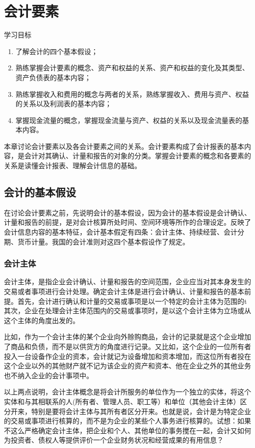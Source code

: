 \chapter{会计要素}
	{\heiti 学习目标}

	\begin{enumerate}
		\item 了解会计的四个基本假设；
		\item 熟练掌握会计要素的概念、资产和权益的关系、资产和权益的变化及其类型、资产负债表的基本内容；
		\item 熟练掌握收入和费用的概念与两者的关系，熟练掌握收入、费用与资产、权益的关系以及利润表的基本内容；
		\item 掌握现金流量的概念，掌握现金流量与资产、权益的关系以及现金流量表的基本内容。
	\end{enumerate}

	本章讨论会计要素以及各会计要素之间的关系。会计要素构成了会计报表的基本内容，是会计对其确认、计量和报告的对象的分类。掌握会计要素的概念和各要素的关系是读懂会计报表、理解会计信息的基础。

	\section{会计的基本假设}
	
	在讨论会计要素之前，先说明会计的基本假设，因为会计的基本假设是会计确认、计量和报告的前提，是对会计核算所处时间、空间环境等所作的合理设定。反映了会计信息内容的基本特征，会计基本假定有四条：会计主体、持续经营、会计分期、货币计量。我国的会计准则对这四个基本假设作了规定。
	
		\subsection{会计主体}

		会计主体，是指企业会计确认、计量和报告的空间范围，企业应当对其本身发生的交易或者事项进行会计处理。确定会计主体是进行会计确认、计量和报告的基本前提。首先，会计进行确认和计量的交易或事项是以一个特定的会计主体为范围的t其次，企业在处理会计主体范围内的交易或事项时，是以这个会计主体为立场或从这个主体的角度出发的。
		
		比如，作为一个会计主体的某个企业向外赊购商品，会计的记录就是这个企业增加了商品和负债，而不是以供货方的角度进行记录。又比如，这个企业的一位所有者投入一台设备作企业的资本，会计就记为设备增加和资本增加，而这位所有者投在这个企业以外的其他财产就不记为该企业的资产和资本、他在企业之外的其他业务也不纳入企业的会计事项中。
		
		以上两点说明，会计主体概念是将会计所服务的单位作为一个独立的实体，将这个实体和与其相联系的人(所有者、管理人员、职工等）和单位（其他会计主体）区分开来，特别是要将会计主体与其所有者区分开来。也就是说，会计是为特定企业的交易或事项进行核算的，而不是为企业的某些个人事务进行核算的。试想：如果不这么严格确定会计主体，把企业和个人、其他单位的事务搅在一起，会计又如何为投资者、债权人等提供评价一个企业财务状况和经营成果的有用信息？
		
